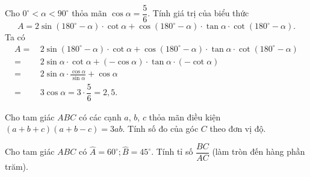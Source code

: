 \begin{ex}%
Cho $0^\circ <\alpha < 90^\circ$ thỏa mãn $\cos\alpha = \dfrac{5}{6}$. Tính giá trị của biểu thức
\[A=2\sin\left(180^\circ -\alpha\right)\cdot \cot\alpha +\cos\left(180^\circ -\alpha\right)\cdot \tan\alpha \cdot \cot\left(\text{180}^\circ -\alpha\right).\]
\loigiai
{Ta có
\begin{align*}
A=&\, 2\sin\left(180^\circ -\alpha\right)\cdot \cot\alpha +\cos\left(180^\circ -\alpha\right)\cdot \tan\alpha \cdot \cot\left(\text{180}^\circ -\alpha\right)\\
=&\, 2\sin\alpha \cdot \cot\alpha +\left(-\cos\alpha\right) \cdot \tan\alpha \cdot \left(-\cot\alpha\right)\\
=&\, 2\sin\alpha \cdot \frac{\cos\alpha }{\sin\alpha }+\cos\alpha \\
=&\, 3\cos\alpha = 3\cdot \dfrac{5}{6} = 2{,}5.
\end{align*}
}
\end{ex}

\begin{ex}%
Cho tam giác $A B C$ có các cạnh $a$, $b$, $c$ thỏa mãn điều kiện $(a+b+c)(a+b-c)=3ab$. Tính số đo của góc $C$ theo đơn vị độ.
\end{ex}

\begin{ex}%
Cho tam giác $ABC$ có $\widehat{A}=60^{\circ} ; \widehat{B}=45^{\circ}$. Tính tỉ số $\dfrac{BC}{AC}$ (làm tròn đến hàng phần trăm).
\end{ex}

